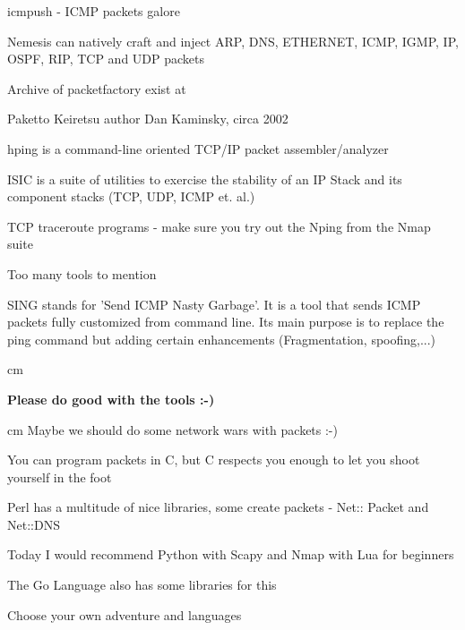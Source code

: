 \documentclass[Screen16to9,17pt]{foils}
\begin{document}

\begin{list1}
\item icmpush - ICMP packets galore
\item Nemesis can natively craft and inject ARP, DNS, ETHERNET, ICMP, IGMP, IP, OSPF, RIP, TCP and UDP packets

Archive of packetfactory exist at 

\item Paketto Keiretsu author Dan Kaminsky, circa 2002
\end{list1}



\begin{list1}
\item hping is a command-line oriented TCP/IP packet assembler/analyzer\\ 
\item  ISIC is a suite of utilities to exercise the stability of an IP Stack and its component stacks (TCP, UDP, ICMP et. al.) 
\item TCP traceroute programs - make sure you try out the Nping from the Nmap suite
\item Too many tools to mention
\end{list1}


SING stands for 'Send ICMP Nasty Garbage'. It is a tool that sends ICMP packets fully customized from command line. Its main purpose is to replace the ping command but adding certain enhancements (Fragmentation, spoofing,...)


 cm
\centerline{\bf\Large Please do good with the tools :-)}
 cm
Maybe we should do some network wars with packets :-)


\begin{list1}
\item You can program packets in C, but C respects you enough to let you shoot yourself in the foot
\item Perl has a multitude of nice libraries, some create packets - Net:: Packet and Net::DNS
\item Today I would recommend Python with Scapy and Nmap with Lua for beginners
\item The Go Language also has some libraries for this
\item Choose your own adventure and languages
\end{list1}
\end{document}

